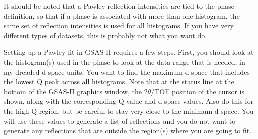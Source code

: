 It should be noted that a Pawley reflection intensities are tied to the phase definition, so that if a phase is associated with more than one histogram, the same set of reflection intensities is used for all histograms. If you have very different types of datasets, this is probably not what you want do.  

Setting up a Pawley fit in GSAS-II requires a few steps. First, you should look at the histogram(s) used in the phase to look at the data range that is needed, in my dreaded d-space units. You want to find the maximum d-space that includes the lowest Q peak across all histograms. Note that at the status line at the bottom of the GSAS-II graphics window, the $2\theta$/TOF position of the cursor is shown, along with the corresponding Q value and d-space values. Also do this for the high Q region, but be careful to stay very close to the minimum d-space. You will use these values to generate a list of reflections and you do not want to generate any reflections that are outside the region(s) where you are going to fit. 

